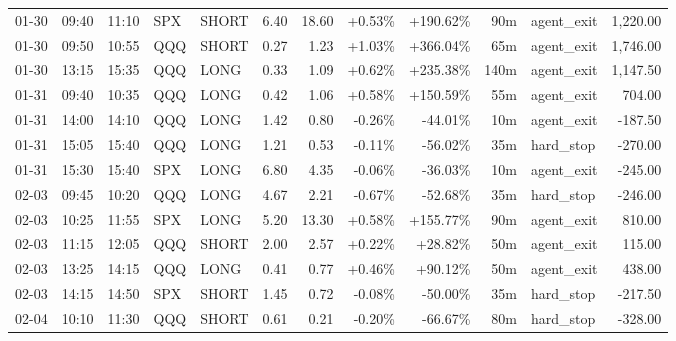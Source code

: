 \documentclass[11pt,a4paper,twoside]{article}
\begin{document}
\begin{center}
\begin{longtable}{>{\color{txtmain}}l l l l l r r r r r >{\color{txtmain}}l r}
01-30 & 09:40 & 11:10 & SPX & SHORT & 6.40 & 18.60 & \textcolor{wingreen}{+0.53\%} & \textcolor{wingreen}{+190.62\%} & 90m & agent\_exit & \textcolor{wingreen}{1,220.00} \\
01-30 & 09:50 & 10:55 & QQQ & SHORT & 0.27 & 1.23 & \textcolor{wingreen}{+1.03\%} & \textcolor{wingreen}{+366.04\%} & 65m & agent\_exit & \textcolor{wingreen}{1,746.00} \\
01-30 & 13:15 & 15:35 & QQQ & LONG & 0.33 & 1.09 & \textcolor{wingreen}{+0.62\%} & \textcolor{wingreen}{+235.38\%} & 140m & agent\_exit & \textcolor{wingreen}{1,147.50} \\
01-31 & 09:40 & 10:35 & QQQ & LONG & 0.42 & 1.06 & \textcolor{wingreen}{+0.58\%} & \textcolor{wingreen}{+150.59\%} & 55m & agent\_exit & \textcolor{wingreen}{704.00} \\
01-31 & 14:00 & 14:10 & QQQ & LONG & 1.42 & 0.80 & \textcolor{lossred}{-0.26\%} & \textcolor{lossred}{-44.01\%} & 10m & agent\_exit & \textcolor{lossred}{-187.50} \\
01-31 & 15:05 & 15:40 & QQQ & LONG & 1.21 & 0.53 & \textcolor{lossred}{-0.11\%} & \textcolor{lossred}{-56.02\%} & 35m & hard\_stop & \textcolor{lossred}{-270.00} \\
01-31 & 15:30 & 15:40 & SPX & LONG & 6.80 & 4.35 & \textcolor{lossred}{-0.06\%} & \textcolor{lossred}{-36.03\%} & 10m & agent\_exit & \textcolor{lossred}{-245.00} \\
02-03 & 09:45 & 10:20 & QQQ & LONG & 4.67 & 2.21 & \textcolor{lossred}{-0.67\%} & \textcolor{lossred}{-52.68\%} & 35m & hard\_stop & \textcolor{lossred}{-246.00} \\
02-03 & 10:25 & 11:55 & SPX & LONG & 5.20 & 13.30 & \textcolor{wingreen}{+0.58\%} & \textcolor{wingreen}{+155.77\%} & 90m & agent\_exit & \textcolor{wingreen}{810.00} \\
02-03 & 11:15 & 12:05 & QQQ & SHORT & 2.00 & 2.57 & \textcolor{wingreen}{+0.22\%} & \textcolor{wingreen}{+28.82\%} & 50m & agent\_exit & \textcolor{wingreen}{115.00} \\
02-03 & 13:25 & 14:15 & QQQ & LONG & 0.41 & 0.77 & \textcolor{wingreen}{+0.46\%} & \textcolor{wingreen}{+90.12\%} & 50m & agent\_exit & \textcolor{wingreen}{438.00} \\
02-03 & 14:15 & 14:50 & SPX & SHORT & 1.45 & 0.72 & \textcolor{lossred}{-0.08\%} & \textcolor{lossred}{-50.00\%} & 35m & hard\_stop & \textcolor{lossred}{-217.50} \\
02-04 & 10:10 & 11:30 & QQQ & SHORT & 0.61 & 0.21 & \textcolor{lossred}{-0.20\%} & \textcolor{lossred}{-66.67\%} & 80m & hard\_stop & \textcolor{lossred}{-328.00} \\

\end{longtable}
\end{center}
\end{document}
